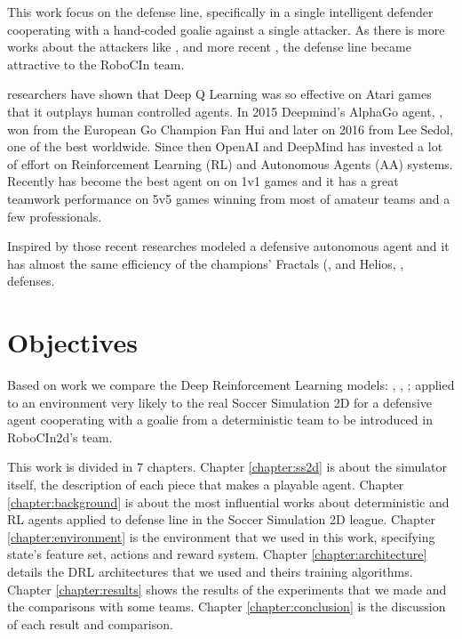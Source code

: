 This work focus on the defense line, specifically in a single intelligent defender cooperating with a hand-coded goalie against a single attacker. As there is more works about the attackers like \cite{passingCrit}, \cite{keepawayRL} and more recent \cite{hausknecht2015deep}, the defense line became attractive to the RoboCIn team.

\cite{deepmind} researchers \cite{dqn} have shown that Deep Q Learning was so effective on Atari games that it outplays human controlled agents. In 2015 Deepmind's AlphaGo agent, \cite{alphago}, won from the European Go Champion Fan Hui and later on 2016 from Lee Sedol, one of the best worldwide. Since then OpenAI and DeepMind has invested a lot of effort on Reinforcement Learning (RL) and Autonomous Agents (AA) systems. Recently \cite{openai5} has become the best agent on \cite{dota2} on 1v1 games and it has a great teamwork performance on 5v5 games winning from most of amateur teams and a few professionals.

Inspired by those recent researches \cite{cyrus} modeled a defensive autonomous agent and it has almost the same efficiency of the champions' Fractals (\cite{glidersv2}, and Helios, \cite{helios2016}, defenses.

\section{Objectives}
 Based on \cite{cyrus} work we compare the Deep Reinforcement Learning models: \cite{dqn}, \cite{DDQN}, \cite{DDPG}; applied to an environment very likely to the real Soccer Simulation 2D for a defensive agent cooperating with a goalie from a deterministic team to be introduced in RoboCIn2d's team.

This work is divided in 7 chapters. Chapter \ref{chapter:ss2d} is about the simulator itself, the description of each piece that makes a playable agent. Chapter \ref{chapter:background} is about the most influential works about deterministic and RL agents applied to defense line in the Soccer Simulation 2D league. Chapter \ref{chapter:environment} is the environment that we used in this work, specifying state's feature set, actions and reward system. Chapter \ref{chapter:architecture} details the DRL architectures that we used and theirs training algorithms. Chapter \ref{chapter:results} shows the results of the experiments that we made and the comparisons with some teams. Chapter \ref{chapter:conclusion} is the discussion of each result and comparison.